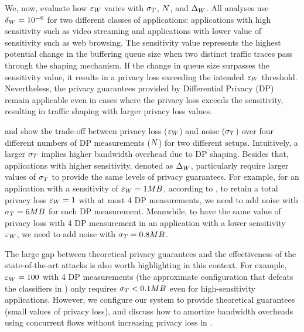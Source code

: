We, now,  evaluate how $\varepsilon_{W}$ varies with $\sigma_T$, $N$, and $\Delta_{W}$.
All analyses use $\delta_W = 10^{-6}$ for two different classes of applications: applications with high sensitivity such as video streaming and applications with lower value of sensitivity such as web browsing.
The sensitivity value represents the highest potential change in the buffering queue size when two distinct traffic traces pass through the shaping mechanism.
If the change in queue size surpasses the sensitivity value, it results in a privacy loss exceeding the intended $\varepsilon_{W}$ threshold.
Nevertheless, the privacy guarantees provided by Differential Privacy (DP) remain applicable even in cases where the privacy loss exceeds the sensitivity, resulting in traffic shaping with larger privacy loss values.


 and  show the trade-off between privacy loss ($\varepsilon_{W}$) and noise ($\sigma_T$) over four different numbers of DP measurements ($N$) for two different setups.
Intuitively, a larger $\sigma_T$ implies higher bandwidth overhead due to DP shaping.
Besides that, applications with higher sensitivity, denoted as $\Delta_{W}$, particularly require larger values of $\sigma_T$ to provide the same levels of privacy guarantees.
For example, for an application with a sensitivity of $\varepsilon_{W}=1MB$, according to , to retain a total privacy loss $\varepsilon_{W} = 1$ with at most 4 DP measurements, we need to add noise with $\sigma_T = 6 MB$ for each DP measurement.
Meanwhile, to have the same value of privacy loss with 4 DP measurement in an application with a lower sensitivity $\varepsilon_{W}$, we need to add noise with $\sigma_T = 0.8 MB$.

The large gap between theoretical privacy guarantees and the effectiveness of the state-of-the-art attacks is also worth highlighting in this context.
For example, $\varepsilon_{W} = 100$ with 4 DP measurements (the approximate configuration that defeats the classifiers in ) only requires $\sigma_T < 0.1 MB$ even for high-sensitivity applications.
However, we configure our system to provide theoretical guarantees (\ie small values of privacy loss), and discuss how to amortize bandwidth overheads using concurrent flows without increasing privacy loss in .

